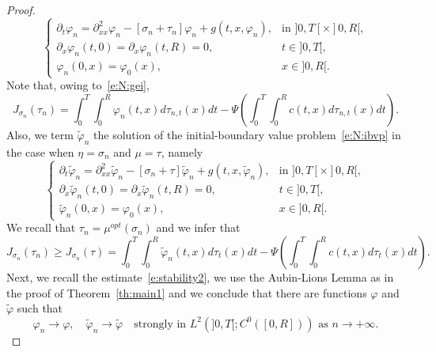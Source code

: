 \documentclass[11pt,leqno]{amsart}
\numberwithin{equation}{section}
\begin{document}
\begin{proof}
\begin{equation}
\label{e:N:ibvpn}
  \begin{cases}
{\partial_t} {\varphi}_n = {\partial_{xx}^2} {\varphi}_n -  [\sigma_n + \tau_n] {\varphi}_n + g(t,x, {\varphi}_n), & \text{in $]0, T[ \times ]0, R[$} ,  \\
{\partial_x } {\varphi}_n(t,0)={\partial_x } {\varphi}_n(t,R) = 0, & t \in ]0, T[, \\
{\varphi}_n(0,x) = {\varphi}_0(x), & x \in ]0,R[.
    \end{cases}
\end{equation}
Note that, owing to~\eqref{e:N:gei}, 
\begin{equation}
\label{e:N:geienne}
   J_{\sigma_n} \left( \tau_n \right)=
    \int_0^T \int_0^R 
    {\varphi}_n (t, x) d \tau_{n,t}(x)  dt - \Psi \left( 
    \int_0^T \int_0^R 
    c (t, x) d \tau_{n,t}(x)  dt \right).
\end{equation}
Also, we term $\tilde {\varphi}_n$ the solution of the initial-boundary value problem~\eqref{e:N:ibvp} in the case when $\eta= \sigma_n$ and $\mu= \tau$, namely
\begin{equation}
\label{e:N:ibvpnt}
  \begin{cases}
{\partial_t} \tilde {\varphi}_n = {\partial_{xx}^2} \tilde {\varphi}_n -  [\sigma_n + \tau] \tilde {\varphi}_n + g(t,x, \tilde
{\varphi}_n), & \text{in $]0, T[ \times ]0, R[$} ,  \\
{\partial_x } \tilde {\varphi}_n(t,0)={\partial_x } \tilde {\varphi}_n(t,R) = 0, & t \in ]0, T[, \\
\tilde {\varphi}_n(0,x) = {\varphi}_0(x), & x \in ]0,R[.
    \end{cases}
\end{equation}
We recall that $\tau_n = \mu^{opt} (\sigma_n)$ and we infer that  
\begin{equation}
\label{e:maggioreuguale2}
J_{\sigma_n} \left( \tau_n \right) \ge 
J_{\sigma_n} \left( \tau \right) =
\int_0^T \int_0^R 
   \tilde  {\varphi}_n (t, x) d \tau_t (x) dt - \Psi \left( 
    \int_0^T \int_0^R 
    c (t, x) d \tau_t(x) dt \right).
\end{equation}
Next, we recall the estimate~\eqref{e:stability2}, we use the Aubin-Lions Lemma as in the proof of Theorem~\ref{th:main1} and we conclude that 
there are functions ${\varphi}$ and $\tilde {\varphi}$ such that
\begin{equation}
\label{e:convergenzafhi}
    {\varphi}_n \to {\varphi}, \quad \tilde {\varphi}_n \to \tilde {\varphi}
    \quad \text{strongly in $L^2 (]0, T[; C^0 ([0, R]))$ as $n \to + \infty$}.

\end{equation}
\end{proof}
\end{document}
